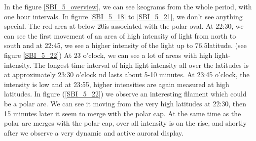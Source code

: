 \documentclass[10pt,a4paper]{article}
\begin{document}
In the figure \ref{SBI_5_overview}, we can see keograms from the whole period, with one hour intervals. In figure \ref{SBI_5_18} to \ref{SBI_5_21}, we don't see anything 
special. The red area at below $20$\textdegree is associated with the polar oval. At 22:30, we can see the first movement of an area of high intensity of light from north to 
south and at 22:45, we see a higher intensity of the light up to $76.5$\textdegree latitude. (see figure \ref{SBI_5_22})
At 23 o'clock, we can see a lot of areas with high light-intensity. The longest time interval of high light intensity all over the latitudes is at approximately 23:30 o'clock 
nd lasts about 5-10 minutes. At 23:45 o'clock, the intensity is low and at 23:55, higher intensities are again measured at high latitudes. In figure (\ref{SBI_5_22}) we 
observe an interesting filament which could be a polar arc. We can see it moving from the very high latitudes at 22:30, then 15 minutes later it seem to merge with the 
polar cap. At the same time as the polar arc merges with the polar cap, over all intensity is on the rise, and shortly after we observe a very dynamic and active 
auroral display.  
\end{document}
